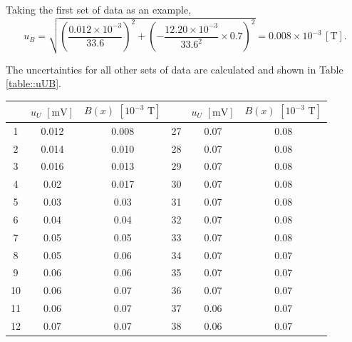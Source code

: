 \documentclass[a4paper]{article}
\begin{document}
Taking the first set of data as an example,
$$  u_B = \sqrt{(\frac{0.012\times 10^{-3}}{33.6})^2 + (-\frac{12.20\times 10^{-3}}{33.6^2}\times 0.7)^2} = 0.008 \times10^{-3}\,[\text{T}]. $$

The uncertainties for all other sets of data are calculated and shown in Table \ref{table::uUB}.

\begin{table}[htbp]
	\centering
	\begin{tabular}{ccc||ccc}
		\hline
		   & $u_U\,\,[\text{mV}]$ & $B(x)\,\,[10^{-3}\,\,\text{T}]$ &    & $u_U\,\,[\text{mV}]$ & $B(x)\,\,[10^{-3}\,\,\text{T}]$ \\
		\hline
		1  & 0.012                & 0.008                           & 27 & 0.07                 & 0.08                            \\
		2  & 0.014                & 0.010                           & 28 & 0.07                 & 0.08                            \\
		3  & 0.016                & 0.013                           & 29 & 0.07                 & 0.08                            \\
		4  & 0.02                 & 0.017                           & 30 & 0.07                 & 0.08                            \\
		5  & 0.03                 & 0.03                            & 31 & 0.07                 & 0.08                            \\
		6  & 0.04                 & 0.04                            & 32 & 0.07                 & 0.08                            \\
		7  & 0.05                 & 0.05                            & 33 & 0.07                 & 0.08                            \\
		8  & 0.05                 & 0.06                            & 34 & 0.07                 & 0.07                            \\
		9  & 0.06                 & 0.06                            & 35 & 0.07                 & 0.07                            \\
		10 & 0.06                 & 0.07                            & 36 & 0.07                 & 0.07                            \\
		11 & 0.06                 & 0.07                            & 37 & 0.06                 & 0.07                            \\
		12 & 0.07                 & 0.07                            & 38 & 0.06                 & 0.07                            \\

\end{tabular}
\end{table}
\end{document}
